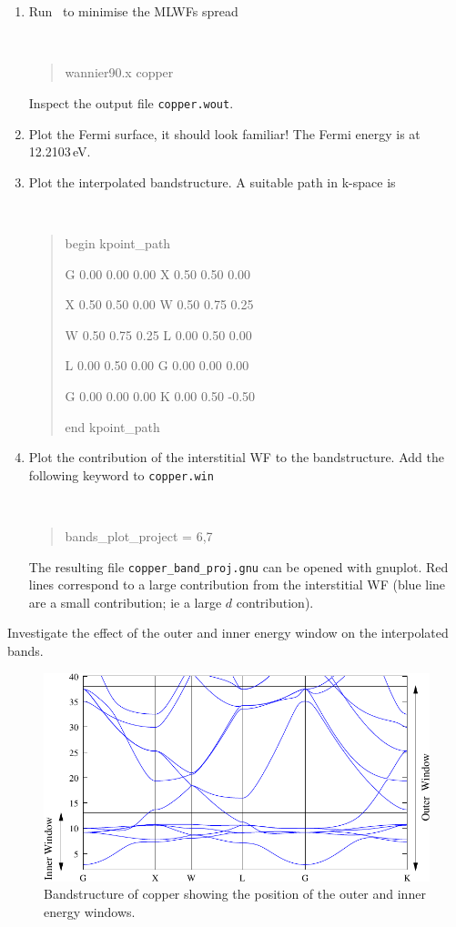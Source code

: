 \documentclass[a4paper,11pt,twoside]{article}
\begin{document}
\begin{enumerate}
\item Run \wannier\ to minimise the MLWFs spread
{\tt
\begin{quote}
wannier90.x copper
\end{quote} }
Inspect the output file {\tt copper.wout}. 

\item Plot the Fermi surface, it should look familiar! The Fermi
  energy is at 12.2103\,eV. 

\item Plot the interpolated bandstructure. A suitable path in k-space is
\smallskip
{\tt
\begin{quote}
begin kpoint\_path

G 0.00  0.00  0.00    X 0.50  0.50  0.00

X 0.50  0.50  0.00    W 0.50  0.75  0.25

W 0.50  0.75  0.25    L 0.00  0.50  0.00

L 0.00  0.50  0.00    G 0.00  0.00  0.00

G 0.00  0.00  0.00    K 0.00  0.50 -0.50
 
end kpoint\_path
\end{quote} }
\item Plot the contribution of the interstitial WF to the
  bandstructure. Add the following keyword to {\tt copper.win}
\smallskip
{\tt
\begin{quote}
bands\_plot\_project = 6,7
\end{quote} } The resulting file {\tt copper\_band\_proj.gnu} can be
opened with gnuplot. Red lines correspond to a large contribution from
the interstitial WF (blue line are a small contribution; ie a large
$d$ contribution).


\end{enumerate}




Investigate the effect of the outer and inner energy window on the
interpolated bands. 



\begin{figure}[h]
\begin{center}
\includegraphics{cu}
\caption{Bandstructure of copper showing the position of the outer
  and inner energy windows.} 
\label{fig:cu-bnd}
\end{center}
\end{figure}
\end{document}

